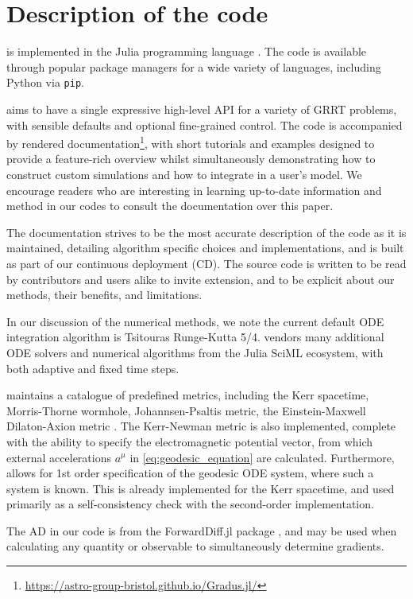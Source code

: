 \section{Description of the code}

\Gradus is implemented in the Julia programming language \citep{Bezanson_Julia_A_fresh_2017}. The code is available through popular package managers for a wide variety of languages, including Python via \texttt{pip}.

\Gradus aims to have a single expressive high-level API for a variety of GRRT problems, with sensible defaults and optional fine-grained control. The code is accompanied by rendered documentation\footnote{\url{https://astro-group-bristol.github.io/Gradus.jl/}}, with short tutorials and examples designed to provide a feature-rich overview whilst simultaneously demonstrating how to construct custom simulations and how to integrate \Gradus in a user's model. We encourage readers who are interesting in learning up-to-date information and method in our codes to consult the documentation over this paper. 

The documentation strives to be the most accurate description of the code as it is maintained, detailing algorithm specific choices and implementations, and is built as part of our continuous deployment (CD). The source code is written to be read by contributors and users alike to invite extension, and to be explicit about our methods, their benefits, and limitations.

In our discussion of the numerical methods, we note the current default ODE integration algorithm is Tsitouras Runge-Kutta 5/4. \Gradus vendors many additional ODE solvers and numerical algorithms from the Julia SciML ecosystem, with both adaptive and fixed time steps.

\Gradus maintains a catalogue of predefined metrics, including the Kerr spacetime, Morris-Thorne wormhole, Johannsen-Psaltis metric, the Einstein-Maxwell Dilaton-Axion metric . The Kerr-Newman metric is also implemented, complete with the ability to specify the electromagnetic potential vector, from which external accelerations $a^\mu$ in \eqref{eq:geodesic_equation} are calculated. Furthermore, \Gradus allows for 1st order specification of the geodesic ODE system, where such a system is known. This is already implemented for the Kerr spacetime, and used primarily as a self-consistency check with the second-order implementation.

The AD in our code is from the ForwardDiff.jl package \citep{RevelsLubinPapamarkou2016}, and may be used when calculating any quantity or observable to simultaneously determine gradients.

